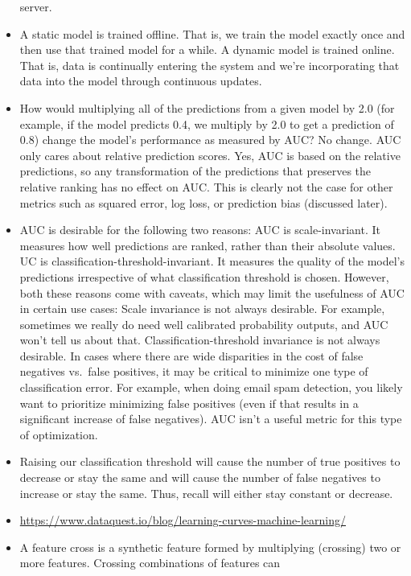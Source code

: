 \documentclass[]{book}
\theoremstyle{definition}
\theoremstyle{definition}
\theoremstyle{definition}
\theoremstyle{remark}
\begin{document}
\begin{itemize}
  server.
\item
  A static model is trained offline. That is, we train the model exactly
  once and then use that trained model for a while. A dynamic model is
  trained online. That is, data is continually entering the system and
  we're incorporating that data into the model through continuous
  updates.
\item
  How would multiplying all of the predictions from a given model by 2.0
  (for example, if the model predicts 0.4, we multiply by 2.0 to get a
  prediction of 0.8) change the model's performance as measured by AUC?
  No change. AUC only cares about relative prediction scores. Yes, AUC
  is based on the relative predictions, so any transformation of the
  predictions that preserves the relative ranking has no effect on AUC.
  This is clearly not the case for other metrics such as squared error,
  log loss, or prediction bias (discussed later).
\item
  AUC is desirable for the following two reasons: AUC is
  scale-invariant. It measures how well predictions are ranked, rather
  than their absolute values. UC is classification-threshold-invariant.
  It measures the quality of the model's predictions irrespective of
  what classification threshold is chosen. However, both these reasons
  come with caveats, which may limit the usefulness of AUC in certain
  use cases: Scale invariance is not always desirable. For example,
  sometimes we really do need well calibrated probability outputs, and
  AUC won't tell us about that. Classification-threshold invariance is
  not always desirable. In cases where there are wide disparities in the
  cost of false negatives vs.~false positives, it may be critical to
  minimize one type of classification error. For example, when doing
  email spam detection, you likely want to prioritize minimizing false
  positives (even if that results in a significant increase of false
  negatives). AUC isn't a useful metric for this type of optimization.
\item
  Raising our classification threshold will cause the number of true
  positives to decrease or stay the same and will cause the number of
  false negatives to increase or stay the same. Thus, recall will either
  stay constant or decrease.
\item
  \url{https://www.dataquest.io/blog/learning-curves-machine-learning/}
\item
  A feature cross is a synthetic feature formed by multiplying
  (crossing) two or more features. Crossing combinations of features can

\end{itemize}
\end{document}
